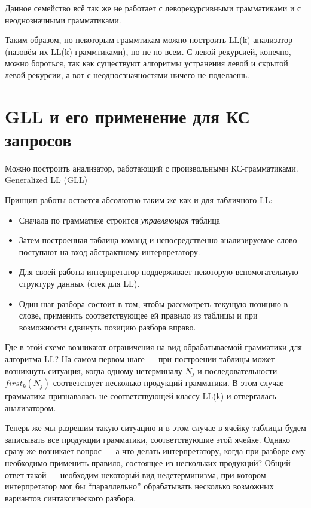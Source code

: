 Данное семейство всё так же не работает с леворекурсивными грамматиками и с неоднозначными грамматиками.

Таким образом, по некоторым граммтикам можно построить LL(k) анализатор (назовём их LL(k) граммтиками), но не по всем.
С левой рекурсией, конечно, можно бороться, так как существуют алгоритмы устранения левой и скрытой левой рекурсии, а вот с неодносзначностями ничего не поделаешь.



\section{GLL и его применение для КС запросов}

Можно построить анализатор, работающий с произвольными КС-грамматиками.
Generalized LL (GLL)~\cite{Scott:2010:GP:1860132.1860320,10.1007/978-3-662-46663-6_5}

Принцип работы остается абсолютно таким же как и для табличного LL: 
\begin{itemize}
  \item Сначала по грамматике строится \textit{управляющая} таблица
  \item Затем построенная таблица команд и непосредственно анализируемое слово поступают на вход абстрактному интерпретатору.
  \item Для своей работы интерпретатор поддерживает некоторую вспомогательную структуру данных (стек для LL).
  \item Один шаг разбора состоит в том, чтобы рассмотреть текущую позицию в слове, применить соответствующее ей правило из таблицы и при возможности сдвинуть позицию разбора вправо.
\end{itemize}

Где в этой схеме возникают ограничения на вид обрабатываемой грамматики для алгоритма LL? На самом первом шаге --- при построении таблицы может возникнуть ситуация, когда одному нетерминалу $N_j$ и последовательности $first_k(N_j)$ соответствует несколько продукций грамматики. В этом случае грамматика признавалась не соответствующей классу LL(k) и отвергалась анализатором.

Теперь же мы разрешим такую ситуацию и в этом случае в ячейку таблицы будем записывать все продукции грамматики, соответствующие этой ячейке. Однако сразу же возникает вопрос --- а что делать интерпретатору, когда при разборе ему необходимо применить правило, состоящее из нескольких продукций? Общий ответ такой --- необходим некоторый вид недетерминизма, при котором интерпретатор мог бы ``параллельно'' обрабатывать несколько возможных вариантов синтаксического разбора.

